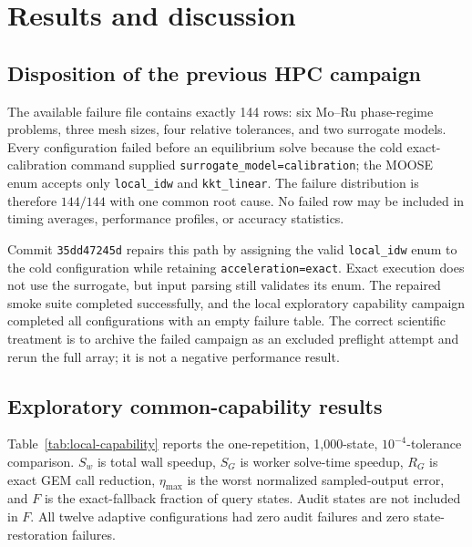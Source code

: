 \documentclass[11pt]{article}
\newcommand{\code}[1]{\texttt{#1}}
\begin{document}
\section{Results and discussion}

\subsection{Disposition of the previous HPC campaign}

The available failure file contains exactly 144 rows: six Mo--Ru phase-regime problems, three mesh
sizes, four relative tolerances, and two surrogate models.  Every configuration failed before an
equilibrium solve because the cold exact-calibration command supplied
\code{surrogate\_model=calibration}; the MOOSE enum accepts only \code{local\_idw} and
\code{kkt\_linear}.  The failure distribution is therefore \(144/144\) with one common root cause.
No failed row may be included in timing averages, performance profiles, or accuracy statistics.

Commit \code{35dd47245d} repairs this path by assigning the valid \code{local\_idw} enum to the cold
configuration while retaining \code{acceleration=exact}.  Exact execution does not use the
surrogate, but input parsing still validates its enum.  The repaired smoke suite completed
successfully, and the local exploratory capability campaign completed all configurations with an
empty failure table.  The correct scientific treatment is to archive the failed campaign as an
excluded preflight attempt and rerun the full array; it is not a negative performance result.

\subsection{Exploratory common-capability results}

Table~\ref{tab:local-capability} reports the one-repetition, 1,000-state, \(10^{-4}\)-tolerance
comparison.  \(S_w\) is total wall speedup, \(S_G\) is worker solve-time speedup, \(R_G\) is exact
GEM call reduction, \(\eta_{\max}\) is the worst normalized sampled-output error, and \(F\) is the
exact-fallback fraction of query states.  Audit states are not included in \(F\).  All twelve
adaptive configurations had zero audit failures and zero state-restoration failures.
\end{document}
